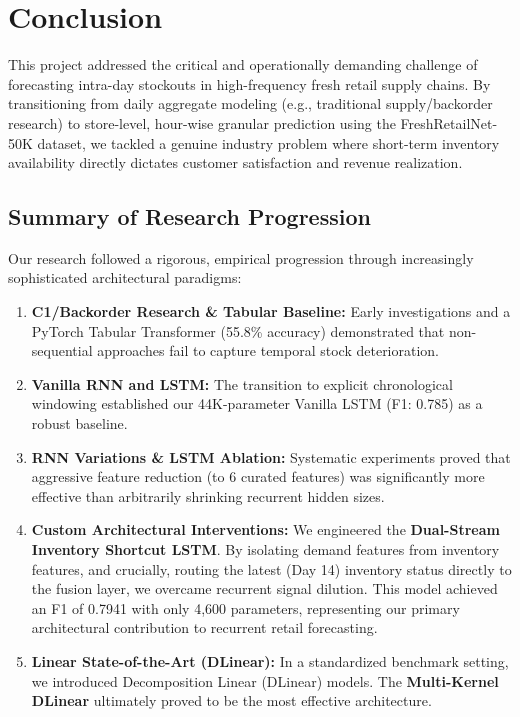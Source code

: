 \chapter{Conclusion}
\label{chap:conclusion}

This project addressed the critical and operationally demanding challenge of forecasting intra-day stockouts in high-frequency fresh retail supply chains. By transitioning from daily aggregate modeling (e.g., traditional supply/backorder research) to store-level, hour-wise granular prediction using the FreshRetailNet-50K dataset, we tackled a genuine industry problem where short-term inventory availability directly dictates customer satisfaction and revenue realization.

\section{Summary of Research Progression}

Our research followed a rigorous, empirical progression through increasingly sophisticated architectural paradigms:
\begin{enumerate}
    \item \textbf{C1/Backorder Research \& Tabular Baseline:} Early investigations and a PyTorch Tabular Transformer (55.8\% accuracy) demonstrated that non-sequential approaches fail to capture temporal stock deterioration.
    \item \textbf{Vanilla RNN and LSTM:} The transition to explicit chronological windowing established our 44K-parameter Vanilla LSTM (F1: 0.785) as a robust baseline.
    \item \textbf{RNN Variations \& LSTM Ablation:} Systematic experiments proved that aggressive feature reduction (to 6 curated features) was significantly more effective than arbitrarily shrinking recurrent hidden sizes.
    \item \textbf{Custom Architectural Interventions:} We engineered the \textbf{Dual-Stream Inventory Shortcut LSTM}. By isolating demand features from inventory features, and crucially, routing the latest (Day 14) inventory status directly to the fusion layer, we overcame recurrent signal dilution. This model achieved an F1 of 0.7941 with only 4,600 parameters, representing our primary architectural contribution to recurrent retail forecasting.
    \item \textbf{Linear State-of-the-Art (DLinear):} In a standardized benchmark setting, we introduced Decomposition Linear (DLinear) models. The \textbf{Multi-Kernel DLinear} ultimately proved to be the most effective architecture. 
\end{enumerate}

